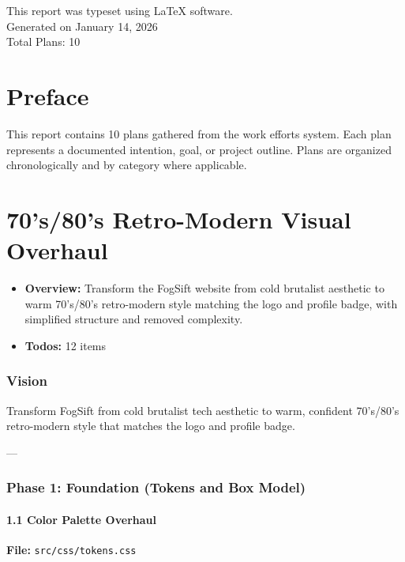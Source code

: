 \documentclass{book}
\begin{document}
\thispagestyle{empty}
\begin{flushleft}
\vspace*{\fill}
This report was typeset using \LaTeX{} software.\\
Generated on January 14, 2026\\
Total Plans: 10\\
\vspace{\fill}
\end{flushleft}

\addtocounter{page}{2}

\chapter*{Preface}
This report contains 10 plans gathered from the work efforts system.
Each plan represents a documented intention, goal, or project outline.
Plans are organized chronologically and by category where applicable.

\setcounter{tocdepth}{2}
\tableofcontents

\mainmatter

\chapter{70's/80's Retro-Modern Visual Overhaul}

\begin{itemize}
\item \textbf{Overview:} Transform the FogSift website from cold brutalist aesthetic to warm 70's/80's retro-modern style matching the logo and profile badge, with simplified structure and removed complexity.
\item \textbf{Todos:} 12 items
\end{itemize}


\subsection{Vision}
Transform FogSift from cold brutalist tech aesthetic to warm, confident 70's/80's retro-modern style that matches the logo and profile badge.

---

\subsection{Phase 1: Foundation (Tokens and Box Model)}

\subsubsection{1.1 Color Palette Overhaul}
\textbf{File:} \texttt{src/css/tokens.css}
\end{document}
